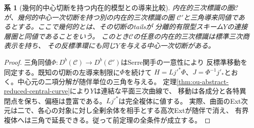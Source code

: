 \documentclass[11pt,a4paper]{ltjsarticle}
\newtheorem{corollary}[theorem]{系}
\theoremstyle{definition}
\begin{document}
\begin{corollary}[幾何的中心切断を持つ内在的模型との導来比較]
\label{cor:ou-geometric-slice-derived-invariance}
内在的三次標識の圏$\mathcal C$が、幾何的中心一次切断を持つ別の内在的三次標識の圏
$\mathcal C'$と三角導来同値であるとする。ここで幾何的とは、その切断のtailsが
分離的有限型スキーム$Y$の連接層圏と同値であることをいう。
このとき$\mathcal C$の任意の内在的三次標識は標準三次商表示を持ち、
その反標準環にも同じ$Y$を与える中心一次切断がある。
\end{corollary}
\begin{proof}
三角同値$\Phi:D^b(\mathcal C)\to D^b(\mathcal C')$はSerre関手の一意性により
反標準移動を同定する。既知の切断の左導来制限に$\Phi$を続けて
$H=Lj'^*\Phi$、$J=\Phi^{-1}j'_*$とおく。中心元の二項分解が随伴単位の三角を与える。
定理\ref{thm:ou-abstract-reduced-central-curve}により$Y$は連結な平面三次曲線で、
移動は各成分と各特異閉点を保ち、偏極は豊富である。$Lj'^*$は完全複体に値する。
実際、曲面のExt次元は二で、各心の対象に対し全剰余体を相手とする高次Extが随伴で消え、
有界複体へは三角で延長できる。従って前定理の全条件が成立する。
\end{proof}
\end{document}
